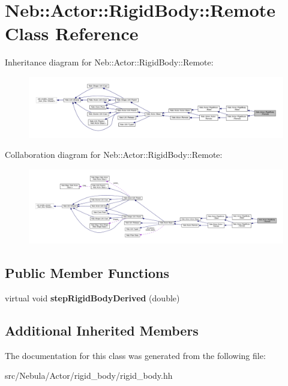 \hypertarget{classNeb_1_1Actor_1_1RigidBody_1_1Remote}{\section{Neb\-:\-:Actor\-:\-:Rigid\-Body\-:\-:Remote Class Reference}
\label{classNeb_1_1Actor_1_1RigidBody_1_1Remote}
}


Inheritance diagram for Neb\-:\-:Actor\-:\-:Rigid\-Body\-:\-:Remote\-:
\nopagebreak
\begin{figure}[H]
\begin{center}
\leavevmode
\includegraphics[width=350pt]{classNeb_1_1Actor_1_1RigidBody_1_1Remote__inherit__graph}
\end{center}
\end{figure}


Collaboration diagram for Neb\-:\-:Actor\-:\-:Rigid\-Body\-:\-:Remote\-:
\nopagebreak
\begin{figure}[H]
\begin{center}
\leavevmode
\includegraphics[width=350pt]{classNeb_1_1Actor_1_1RigidBody_1_1Remote__coll__graph}
\end{center}
\end{figure}
\subsection*{Public Member Functions}
\begin{DoxyCompactItemize}
\item 
\hypertarget{classNeb_1_1Actor_1_1RigidBody_1_1Remote_a83055685e2431dd6e68fbd55594bf771}{virtual void {\bfseries step\-Rigid\-Body\-Derived} (double)}\label{classNeb_1_1Actor_1_1RigidBody_1_1Remote_a83055685e2431dd6e68fbd55594bf771}

\end{DoxyCompactItemize}
\subsection*{Additional Inherited Members}


The documentation for this class was generated from the following file\-:\begin{DoxyCompactItemize}
\item 
src/\-Nebula/\-Actor/rigid\-\_\-body/rigid\-\_\-body.\-hh\end{DoxyCompactItemize}
